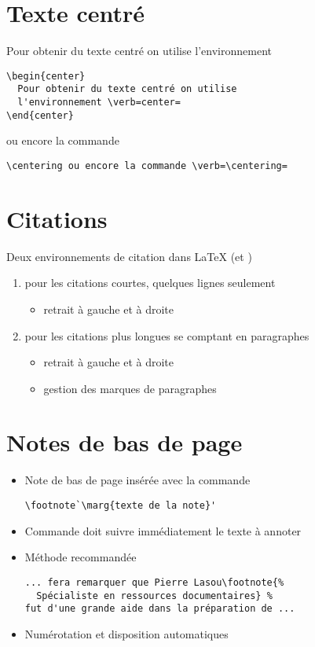 \section{Texte centré}

\begin{center}
  Pour obtenir du texte centré on utilise l'environnement
\end{center}

\begin{lstlisting}
\begin{center}
  Pour obtenir du texte centré on utilise
  l'environnement \verb=center=
\end{center}
\end{lstlisting}

{\centering ou encore la commande \cmd{\centering}}

\begin{lstlisting}
\centering ou encore la commande \verb=\centering=
\end{lstlisting}


\section{Citations}

Deux environnements de citation dans {\LaTeX} (et )
\begin{enumerate}
\item {} pour les citations courtes, quelques lignes seulement
  \begin{itemize}
  \item retrait à gauche et à droite
  \end{itemize}
\item {} pour les citations plus longues se comptant
  en paragraphes
  \begin{itemize}
  \item retrait à gauche et à droite
  \item gestion des marques de paragraphes
  \end{itemize}
\end{enumerate}


\section{Notes de bas de page}

\begin{itemize}
\item Note de bas de page insérée avec la commande
\begin{lstlisting}
\footnote`\marg{texte de la note}'
\end{lstlisting}
\item Commande doit suivre immédiatement le texte à annoter
\item Méthode recommandée
\begin{lstlisting}[emph=footnote]
... fera remarquer que Pierre Lasou\footnote{%
  Spécialiste en ressources documentaires} %
fut d'une grande aide dans la préparation de ...
\end{lstlisting}
\item Numérotation et disposition automatiques
\end{itemize}


